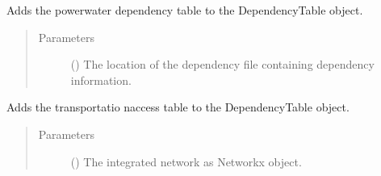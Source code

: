 \documentclass[letterpaper,10pt,english]{sphinxmanual}
\begin{document}
\begin{fulllineitems}
\begin{fulllineitems}
\begin{quote}
\begin{description}
\end{description}\end{quote}

\end{fulllineitems}


\begin{fulllineitems}
\label{\detokenize{apidoc:dreaminsg_integrated_model.src.network_sim_models.interdependencies.DependencyTable.build_power_water_dependencies}}
\sphinxAtStartPar
Adds the power\sphinxhyphen{}water dependency table to the DependencyTable object.
\begin{quote}\begin{description}
\item[{Parameters}] \leavevmode
\sphinxAtStartPar
{} () \textendash{} The location of the dependency file containing dependency information.

\end{description}\end{quote}

\end{fulllineitems}


\begin{fulllineitems}
\label{\detokenize{apidoc:dreaminsg_integrated_model.src.network_sim_models.interdependencies.DependencyTable.build_transportation_access}}
\sphinxAtStartPar
Adds the transportatio naccess table to the DependencyTable object.
\begin{quote}\begin{description}
\item[{Parameters}] \leavevmode
\sphinxAtStartPar
{} () \textendash{} The integrated network as Networkx object.


\end{description}
\end{quote}
\end{fulllineitems}
\end{fulllineitems}
\end{document}
